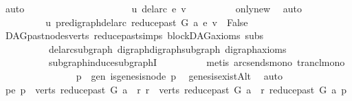 \begin{isabellebody}
\ auto\isanewline
\ \ \ \ \ \ \isamarkupfalse%
\ \ \ \ \isanewline
\ \ \ \ \ \ \isamarkupfalse%
\ \isamarkupfalse%
\ {\isachardoublequoteopen}{\isasymnot}\ u\ {\isasymrightarrow}\isactrlsup {\isacharplus}{\kern0pt}\isactrlbsub del{\isacharunderscore}{\kern0pt}arc\ e\isactrlesub \ v{\isachardoublequoteclose}\isanewline
\ \ \ \ \ \ \ \ \isamarkupfalse%
\ only{\isacharunderscore}{\kern0pt}new\ \isamarkupfalse%
\ auto\ \ \ \ \ \ \ \ \isanewline
\ \ \ \ \ \ \isamarkupfalse%
\ \isamarkupfalse%
\ {\isachardoublequoteopen}u\ {\isasymrightarrow}\isactrlsup {\isacharplus}{\kern0pt}\isactrlbsub pre{\isacharunderscore}{\kern0pt}digraph{\isachardot}{\kern0pt}del{\isacharunderscore}{\kern0pt}arc\ {\isacharparenleft}{\kern0pt}reduce{\isacharunderscore}{\kern0pt}past\ G\ a{\isacharparenright}{\kern0pt}\ e\isactrlesub \ v\ {\isasymLongrightarrow}\ False{\isachardoublequoteclose}\isanewline
\ \ \ \ \ \ \ \ \isamarkupfalse%
\ DAG{\isachardot}{\kern0pt}past{\isacharunderscore}{\kern0pt}nodes{\isacharunderscore}{\kern0pt}verts\ reduce{\isacharunderscore}{\kern0pt}past{\isachardot}{\kern0pt}simps\ blockDAG{\isacharunderscore}{\kern0pt}axioms\ subs\isanewline
\ \ \ \ \ \ \ \ \ \ del{\isacharunderscore}{\kern0pt}arc{\isacharunderscore}{\kern0pt}subgraph\ digraph{\isachardot}{\kern0pt}digraph{\isacharunderscore}{\kern0pt}subgraph\ digraph{\isacharunderscore}{\kern0pt}axioms\ \isanewline
\ \ \ \ \ \ \ \ \ \ subgraph{\isacharunderscore}{\kern0pt}induce{\isacharunderscore}{\kern0pt}subgraphI\isanewline
\ \ \ \ \ \ \ \ \isamarkupfalse%
\ {\isacharparenleft}{\kern0pt}metis\ arcs{\isacharunderscore}{\kern0pt}ends{\isacharunderscore}{\kern0pt}mono\ trancl{\isacharunderscore}{\kern0pt}mono{\isacharparenright}{\kern0pt}\isanewline
\ \ \ \ \isamarkupfalse%
\isanewline
\ \ \isamarkupfalse%
\ \ \isanewline
\ \ \ \ \isamarkupfalse%
\ p\ \ gen{\isacharcolon}{\kern0pt}\ {\isachardoublequoteopen}is{\isacharunderscore}{\kern0pt}genesis{\isacharunderscore}{\kern0pt}node\ p{\isachardoublequoteclose}\ \isamarkupfalse%
\ genesis{\isacharunderscore}{\kern0pt}existAlt\ \isamarkupfalse%
\ auto\isanewline
\ \ \ \ \isamarkupfalse%
\ pe{\isacharcolon}{\kern0pt}\ {\isachardoublequoteopen}p\ {\isasymin}\ verts\ {\isacharparenleft}{\kern0pt}reduce{\isacharunderscore}{\kern0pt}past\ G\ a{\isacharparenright}{\kern0pt}\ {\isasymand}\ {\isacharparenleft}{\kern0pt}{\isasymforall}r{\isachardot}{\kern0pt}\ r\ {\isasymin}\ verts\ {\isacharparenleft}{\kern0pt}reduce{\isacharunderscore}{\kern0pt}past\ G\ a{\isacharparenright}{\kern0pt}\ {\isasymlongrightarrow}\ r\ {\isasymrightarrow}\isactrlsup {\isacharasterisk}{\kern0pt}\isactrlbsub reduce{\isacharunderscore}{\kern0pt}past\ G\ a\isactrlesub \ p{\isacharparenright}{\kern0pt}{\isachardoublequoteclose}\isanewline

\end{isabellebody}

